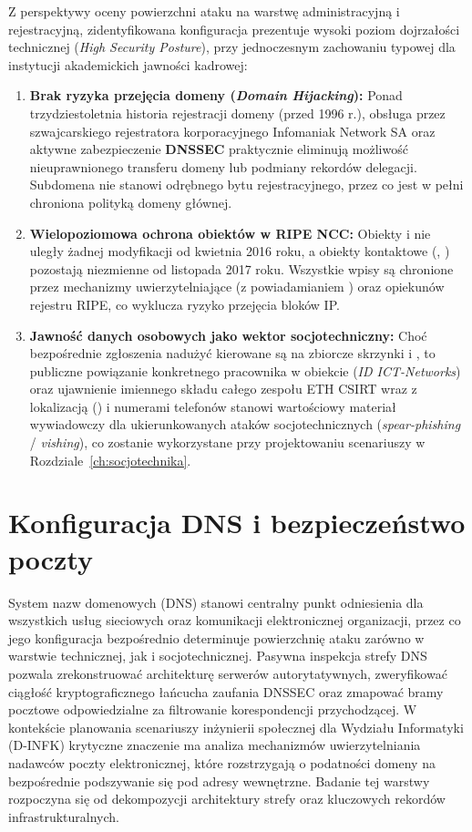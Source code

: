 Z perspektywy oceny powierzchni ataku na warstwę administracyjną i rejestracyjną, zidentyfikowana konfiguracja prezentuje wysoki poziom dojrzałości technicznej (\textit{High Security Posture}), przy jednoczesnym zachowaniu typowej dla instytucji akademickich jawności kadrowej:
\begin{enumerate}
    \item \textbf{Brak ryzyka przejęcia domeny (\textit{Domain Hijacking}):} Ponad trzydziestoletnia historia rejestracji domeny  (przed 1996 r.), obsługa przez szwajcarskiego rejestratora korporacyjnego Infomaniak Network SA oraz aktywne zabezpieczenie \textbf{DNSSEC} praktycznie eliminują możliwość nieuprawnionego transferu domeny lub podmiany rekordów delegacji. Subdomena  nie stanowi odrębnego bytu rejestracyjnego, przez co jest w pełni chroniona polityką domeny głównej.
    \item \textbf{Wielopoziomowa ochrona obiektów w RIPE NCC:} Obiekty  i  nie uległy żadnej modyfikacji od kwietnia 2016 roku, a obiekty kontaktowe (, ) pozostają niezmienne od listopada 2017 roku. Wszystkie wpisy są chronione przez mechanizmy uwierzytelniające  (z powiadamianiem ) oraz opiekunów rejestru RIPE, co wyklucza ryzyko przejęcia bloków IP.
    \item \textbf{Jawność danych osobowych jako wektor socjotechniczny:} Choć bezpośrednie zgłoszenia nadużyć kierowane są na zbiorcze skrzynki  i , to publiczne powiązanie konkretnego pracownika w obiekcie  (\textit{ID ICT-Networks}) oraz ujawnienie imiennego składu całego zespołu ETH CSIRT wraz z lokalizacją () i numerami telefonów stanowi wartościowy materiał wywiadowczy dla ukierunkowanych ataków socjotechnicznych (\textit{spear-phishing} / \textit{vishing}), co zostanie wykorzystane przy projektowaniu scenariuszy w Rozdziale~\ref{ch:socjotechnika}.
\end{enumerate}

\section{Konfiguracja DNS i bezpieczeństwo poczty}\label{sec:dns-poczta}

System nazw domenowych (DNS) stanowi centralny punkt odniesienia dla wszystkich usług sieciowych oraz komunikacji elektronicznej organizacji, przez co jego konfiguracja bezpośrednio determinuje powierzchnię ataku zarówno w warstwie technicznej, jak i socjotechnicznej. Pasywna inspekcja strefy DNS pozwala zrekonstruować architekturę serwerów autorytatywnych, zweryfikować ciągłość kryptograficznego łańcucha zaufania DNSSEC oraz zmapować bramy pocztowe odpowiedzialne za filtrowanie korespondencji przychodzącej. W kontekście planowania scenariuszy inżynierii społecznej dla Wydziału Informatyki (D-INFK) krytyczne znaczenie ma analiza mechanizmów uwierzytelniania nadawców poczty elektronicznej, które rozstrzygają o podatności domeny na bezpośrednie podszywanie się pod adresy wewnętrzne. Badanie tej warstwy rozpoczyna się od dekompozycji architektury strefy oraz kluczowych rekordów infrastrukturalnych.

